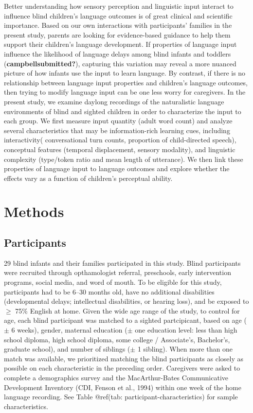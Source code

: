 \documentclass[
  man,floatsintext]{apa6}
\begin{document}
Better understanding how sensory perception and linguistic input interact to influence blind children's language outcomes is of great clinical and scientific importance. Based on our own interactions with participants' families in the present study, parents are looking for evidence-based guidance to help them support their children's language development. If properties of language input influence the likelihood of language delays among blind infants and toddlers (\textbf{campbellsubmitted?}), capturing this variation may reveal a more nuanced picture of how infants use the input to learn language. By contrast, if there is no relationship between language input properties and children's language outcomes, then trying to modify language input can be one less worry for caregivers. In the present study, we examine daylong recordings of the naturalistic language environments of blind and sighted children in order to characterize the input to each group. We first measure input quantity (adult word count) and analyze several characteristics that may be information-rich learning cues, including interactivity( conversational turn counts, proportion of child-directed speech), conceptual features (temporal displacement, sensory modality), and linguistic complexity (type/token ratio and mean length of utterance). We then link these properties of language input to language outcomes and explore whether the effects vary as a function of children's perceptual ability.

\hypertarget{methods}{%
\section{Methods}\label{methods}}

\hypertarget{participants}{%
\subsection{Participants}\label{participants}}

29 blind infants and their families participated in this study. Blind participants were recruited through opthamologist referral, preschools, early intervention programs, social media, and word of mouth. To be eligible for this study, participants had to be 6--30 months old, have no additional disabilities (developmental delays; intellectual disabilities, or hearing loss), and be exposed to \(\geq\) 75\% English at home. Given the wide age range of the study, to control for age, each blind participant was matched to a sighted partcipicant, based on age (\(\pm\) 6 weeks), gender, maternal education (\(\pm\) one education level: less than high school diploma, high school diploma, some college / Associate's, Bachelor's, graduate school), and number of siblings (\(\pm\) 1 sibling). When more than one match was available, we prioritized matching the blind participants as closely as possible on each characteristic in the preceding order. Caregivers were asked to complete a demographics survey and the MacArthur-Bates Communicative Development Inventory (CDI, Fenson et al., 1994) within one week of the home language recording. See Table @ref(tab: participant-characteristics) for sample characteristics.
\end{document}
